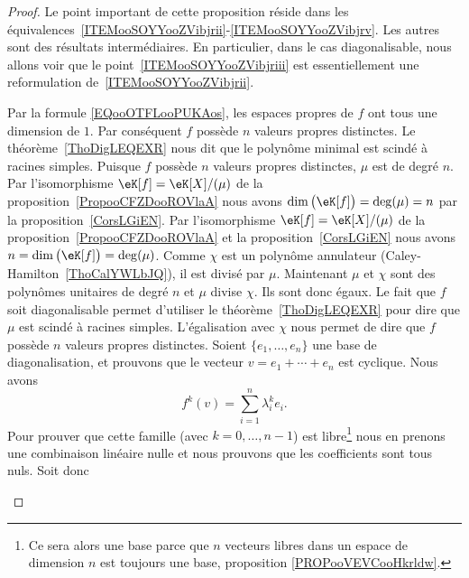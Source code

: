 \begin{proof}
	Le point important de cette proposition réside dans les équivalences~\ref{ITEMooSOYYooZVibjrii}-\ref{ITEMooSOYYooZVibjrv}. Les autres sont des résultats intermédiaires. En particulier, dans le cas diagonalisable, nous allons voir que le point~\ref{ITEMooSOYYooZVibjriii} est essentiellement une reformulation de~\ref{ITEMooSOYYooZVibjrii}.
	\begin{subproof}
		Par la formule \eqref{EQooOTFLooPUKAos}, les espaces propres de \( f\) ont tous une dimension de \( 1\). Par conséquent \( f\) possède \( n\) valeurs propres distinctes.
		Le théorème~\ref{ThoDigLEQEXR} nous dit que le polynôme minimal est scindé à racines simples. Puisque \( f\) possède \( n\) valeurs propres distinctes, \( \mu\) est de degré \( n\).  Par l'isomorphisme \( \eK[f]=\eK[X]/(\mu)\) de la proposition~\ref{PropooCFZDooROVlaA} nous avons \(\dim\big( \eK[f] \big)= \deg(\mu)=n\) par la proposition~\ref{CorsLGiEN}.
		Par l'isomorphisme \( \eK[f]=\eK[X]/(\mu)\) de la proposition~\ref{PropooCFZDooROVlaA} et la proposition~\ref{CorsLGiEN} nous avons \(n=\dim\big( \eK[f] \big)= \deg(\mu)\). Comme \( \chi\) est un polynôme annulateur (Caley-Hamilton~\ref{ThoCalYWLbJQ}), il est divisé par \( \mu\). Maintenant \( \mu\) et \( \chi\) sont des polynômes unitaires de degré \( n\) et \( \mu\) divise \( \chi\). Ils sont donc égaux.
		Le fait que \( f\) soit diagonalisable permet d'utiliser le théorème~\ref{ThoDigLEQEXR} pour dire que \( \mu\) est scindé à racines simples. L'égalisation avec \( \chi \) nous permet de dire que \( f\) possède \( n\) valeurs propres distinctes. Soient \( \{ e_1,\ldots, e_n \}\) une base de diagonalisation, et prouvons que le vecteur \( v=e_1+\cdots +e_n\) est cyclique. Nous avons
		\begin{equation}
			f^k(v)=\sum_{i=1}^n\lambda_i^ke_i.
		\end{equation}
		Pour prouver que cette famille (avec \( k=0,\ldots, n-1\)) est libre\footnote{Ce sera alors une base parce que \( n\) vecteurs libres dans un espace de dimension \( n\) est toujours une base, proposition \ref{PROPooVEVCooHkrldw}.} nous en prenons une combinaison linéaire nulle et nous prouvons que les coefficients sont tous nuls. Soit donc
		\begin{equation}

\end{equation}
\end{subproof}
\end{proof}
